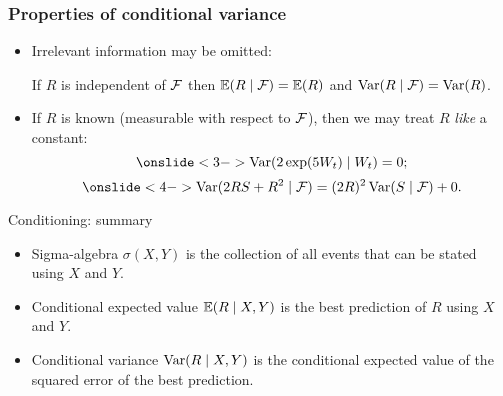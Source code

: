 \begin{frame}
    \frametitle{Properties of conditional variance}

    \begin{itemize}[<+->]
        \item Irrelevant information may be omitted:
        
        If $R$ is \alert{independent} of $\mathcal{F}$ then $\mathbb{E}(R \mid \mathcal{F}) = \mathbb{E}(R)$ and $\operatorname{Var}(R \mid \mathcal{F}) = \operatorname{Var}(R)$.
        

        \item If $R$ is \alert{known} (measurable with respect to $\mathcal{F}$), 
        then we may treat $R$ \textit{like} a constant:
        \[
            \onslide<3->{\Var(2\exp(5W_t) \mid W_t) = 0;}
        \]
        \[
            \onslide<4->{\Var(2R S + R^2 \mid \cF ) = (2R)^2\Var(S \mid \cF) + 0.}
        \]
            
    \end{itemize}


\end{frame}


    \begin{frame}{Conditioning: summary}
    
    \begin{itemize}[<+->]
        \item Sigma-algebra $\sigma(X, Y)$ is the collection of all events that \alert{can be stated} using $X$ and $Y$.
        \item Conditional expected value $\mathbb{E}(R \mid X, Y)$ is the \alert{best prediction} of $R$ using $X$ and $Y$.
        \item Conditional variance $\operatorname{Var}(R \mid X, Y)$ is the conditional expected value of the \alert{squared error} of the best prediction.
    \end{itemize}
      
    \end{frame}
    